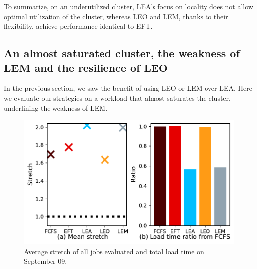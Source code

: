 \documentclass[conference,10pt]{IEEEtran}
\begin{document}
To summarize, on an underutilized cluster, LEA's focus on locality
does not allow optimal utilization of the cluster, whereas LEO and LEM, thanks
to their flexibility,
achieve performance identical to EFT.

\subsection{An almost saturated cluster, the weakness of LEM and the resilience of LEO}\label{sec.09-09}

In the previous section, we saw the benefit of using LEO or LEM over LEA.
Here we evaluate our strategies on a workload that almost saturates the
cluster, underlining the weakness of LEM.


\begin{figure}[t]\centering\includegraphics[width=0.9\linewidth]{../MBSS/plot/Results_FCFS_Score_Backfill_2022-09-09->2022-09-09_V10000_Mean_Stretch_Total_waiting_for_a_load_time_and_transfer_time_450_128_32_256_4_1024.pdf}\caption{Average stretch of all jobs evaluated and total load time on September 09.}\label{stretch.09-09}\end{figure}
\end{document}
